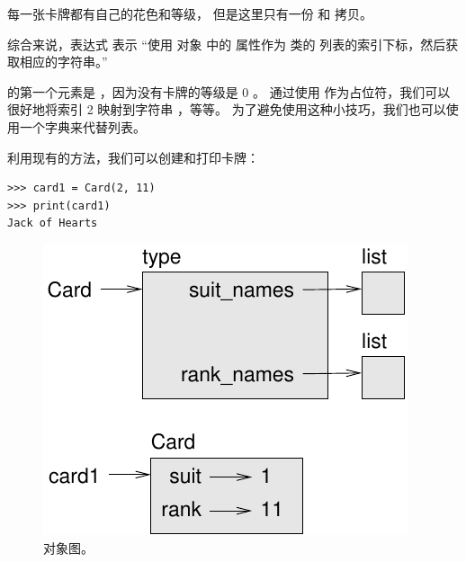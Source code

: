 
每一张卡牌都有自己的花色和等级，
但是这里只有一份  和  拷贝。


综合来说，表达式  表示 ``使用  对象
中的  属性作为  类的 
列表的索引下标，然后获取相应的字符串。''


 的第一个元素是  ，因为没有卡牌的等级是 0 。
通过使用  作为占位符，我们可以很好地将索引 2 映射到字符串  ，等等。
为了避免使用这种小技巧，我们也可以使用一个字典来代替列表。


利用现有的方法，我们可以创建和打印卡牌：

\begin{lstlisting}
>>> card1 = Card(2, 11)
>>> print(card1)
Jack of Hearts
\end{lstlisting}

\begin{figure}
\centerline
{\includegraphics[scale=0.8]{../source/figs/card1.pdf}}
\caption{对象图。}
\label{fig.card1}
\end{figure}

